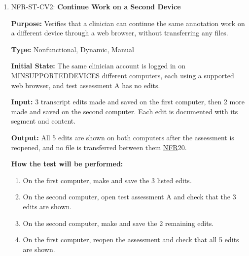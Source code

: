\documentclass[12pt, titlepage]{article}
\newcommand{\srsnfr}[1]{\href{https://github.com/Nour-Fawaz/MacaBoca/blob/main/pdfs/SRS/SRS.pdf}{NFR}}
\renewcommand{\_}{\oldunderscore\allowbreak}
\begin{document}
\begin{enumerate}
  \item NFR-ST-CV2: \textbf{Continue Work on a Second Device\\}
  \begin{mdframed}[linewidth=0.5mm]
      \textbf{Purpose:} Verifies that a clinician can continue the same annotation work on a different device through a web browser, without transferring any files. \par
      \textbf{Type:} Nonfunctional, Dynamic, Manual \par
      \textbf{Initial State:} The same clinician account is logged in on MIN\_SUPPORTED\_DEVICES different computers, each using a supported web browser, and test assessment A has no edits. \par
      \textbf{Input:} 3 transcript edits made and saved on the first computer, then 2 more made and saved on the second computer. Each edit is documented with its segment and content. \par
      \textbf{Output:} All 5 edits are shown on both computers after the assessment is reopened, and no file is transferred between them \srsnfr*{20}. \par
      \textbf{How the test will be performed:}
      \begin{enumerate}
        \item[1.] On the first computer, make and save the 3 listed edits.
        \item[2.] On the second computer, open test assessment A and check that the 3 edits are shown.
        \item[3.] On the second computer, make and save the 2 remaining edits.
        \item[4.] On the first computer, reopen the assessment and check that all 5 edits are shown.
      \end{enumerate}
  \end{mdframed}


\end{enumerate}
\end{document}
